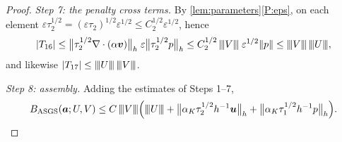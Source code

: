 \documentclass[11pt,a4paper]{article}
\newcommand{\bu}{\boldsymbol{u}}
\newcommand{\bv}{\boldsymbol{v}}
\newcommand{\ba}{\boldsymbol{a}}
\DeclarePairedDelimiter{\norm}{\lVert}{\rVert}
\newcommand{\triplenorm}[1]{{\lvert\kern-0.25ex\lvert\kern-0.25ex\lvert #1
\rvert\kern-0.25ex\rvert\kern-0.25ex\rvert}}
\theoremstyle{plain}
\theoremstyle{remark}
\theoremstyle{definition}
\numberwithin{equation}{section}
\begin{document}
\begin{proof}
\medskip\noindent\emph{Step 7: the penalty cross terms.}
By \cref{lem:parameters}\ref{P:eps}, on each element
$\varepsilon\tau_2^{1/2}=(\varepsilon\tau_2)^{1/2}\varepsilon^{1/2}
\le C_2^{1/2}\varepsilon^{1/2}$, hence
\begin{equation}\label{eq:crosspenalty}
  |T_{16}|
  \le \bigl\lVert\tau_2^{1/2}\nabla\cdot(\alpha\bv)\bigr\rVert_h\;
  \varepsilon\bigl\lVert\tau_2^{1/2}p\bigr\rVert_h
  \le C_2^{1/2}\,\triplenorm{V}\;\varepsilon^{1/2}\norm{p}
  \le \triplenorm{V}\,\triplenorm{U},
\end{equation}
and likewise $|T_{17}|\le\triplenorm{U}\,\triplenorm{V}$.

\medskip\noindent\emph{Step 8: assembly.}
Adding the estimates of Steps 1--7,
\begin{equation}\label{eq:assembly}
  B_{\mathrm{ASGS}}(\ba;U,V)
  \le C\,\triplenorm{V}\Bigl(\triplenorm{U}
  + \bigl\lVert\alpha_K\tau_2^{1/2}h^{-1}\bu\bigr\rVert_h
  + \bigl\lVert\alpha_K\tau_1^{1/2}h^{-1}p\bigr\rVert_h\Bigr).
\end{equation}


\end{proof}
\end{document}
